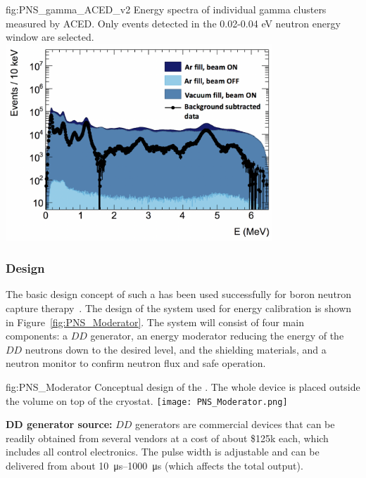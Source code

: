 \begin{dunefigure}{fig:PNS_gamma_ACED_v2}
{Energy spectra of individual gamma clusters measured by ACED. Only events detected in the 0.02-0.04 eV neutron energy window are selected.}
\includegraphics[width=10cm]{graphics/PNS_gamma_ACED_v2.png}
\end{dunefigure}


\subsubsection{Design}
\label{sec:sp-calib-sys-pns-des}

The basic design concept of such a  has been used successfully for boron neutron capture therapy~\cite{bib:Koivunoro2004}. The design of the  system used for energy calibration is shown in Figure~\ref{fig:PNS_Moderator}. The system will consist of four main components: a $DD$ generator, an energy moderator reducing the energy of the $DD$ neutrons down to the desired level, and the shielding materials, and a neutron monitor to confirm neutron flux and safe operation. 

\begin{dunefigure}{fig:PNS_Moderator}
{Conceptual design of the . The whole device is placed outside the  volume on top of the cryostat.}
\texttt{[image: PNS\_Moderator.png]}
\end{dunefigure}



{\bf DD generator source:} $DD$ generators are commercial devices that can be readily obtained from several vendors at a cost of about \$\num{125}k each, which includes all control electronics. The pulse width is adjustable and can be delivered from about \SIrange{10}{1000}{\micro\s} (which affects the total output). 

